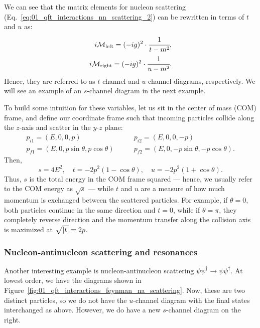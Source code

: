 We can see that the matrix elements for nucleon scattering (Eq.~\ref{eq:01_qft_interactions_nn_scattering_2}) can be rewritten in terms of $t$ and $u$ as:
\begin{equation}
	\label{eq:01_qft_interactions_nn_tchannel_uchannel}
	\begin{split}
		i \mathcal M_{\mathrm{left}} = (-ig)^2 \cdot \cfrac{1}{t - m^2}, \\
		i \mathcal M_{\mathrm{right}} = (-ig)^2 \cdot \cfrac{1}{u - m^2}.
	\end{split}
\end{equation}
Hence, they are referred to as $t$-channel and $u$-channel diagrams, respectively.
We will see an example of an $s$-channel diagram in the next example.

To build some intuition for these variables, let us sit in the center of mass (COM) frame, and define our coordinate frame such that incoming particles collide along the $z$-axis and scatter in the $y$-$z$ plane:
\begin{equation}
	\label{eq:01_qft_interactions_mandelstam_pcom}
	\begin{split}
		p_{i1} = (E, 0, 0, p) &\qquad p_{i2} = (E, 0, 0, -p) \\
		p_{f1} = (E, 0, p\sin\theta, p\cos\theta) &\qquad p_{f2} = (E, 0, -p\sin\theta, -p\cos\theta).
	\end{split}
\end{equation}
Then,
\begin{equation}
	\label{eq:01_qft_interactions_mandelstam_com}
	s = 4E^2, \quad t = -2p^2(1-\cos\theta), \quad u = -2p^2(1+\cos\theta).
\end{equation}
Thus, $s$ is the total energy in the COM frame squared --- hence, we usually refer to the COM energy as $\sqrt{s}$ --- while $t$ and $u$ are a measure of how much momentum is exchanged between the scattered particles.
For example, if $\theta = 0$, both particles continue in the same direction and $t = 0$, while if $\theta = \pi$, they completely 
reverse direction and the momentum transfer along the collision axis is maximized at $\sqrt{\left\lvert t \right\rvert} = 2p$.

\subsubsection{Nucleon-antinucleon scattering and resonances}

Another interesting example is nucleon-antinucleon scattering $\psi\psi^\dagger \rightarrow \psi\psi^\dagger$.
At lowest order, we have the diagrams shown in Figure~\ref{fig:01_qft_interactions_feynman_na_scattering}.
Now, these are two distinct particles, so we do not have the $u$-channel diagram with the final states interchanged as above.
However, we do have a new $s$-channel diagram on the right.

